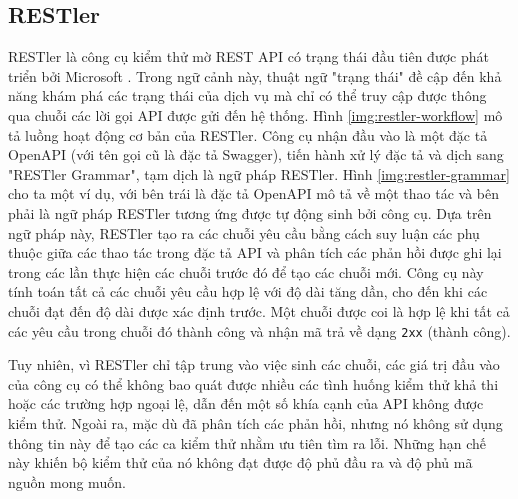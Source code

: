 \subsection{RESTler}
RESTler là công cụ kiểm thử mờ REST API có trạng thái đầu tiên được phát triển bởi Microsoft \cite{atlidakis2019restler}. Trong ngữ cảnh này, thuật ngữ "trạng thái" đề cập đến khả năng khám phá các trạng thái của dịch vụ mà chỉ có thể truy cập được thông qua chuỗi các lời gọi API được gửi đến hệ thống.
Hình \ref{img:restler-workflow} mô tả luồng hoạt động cơ bản của RESTler. Công cụ nhận đầu vào là một đặc tả OpenAPI (với tên gọi cũ là đặc tả Swagger), tiến hành xử lý đặc tả và dịch sang "RESTler Grammar", tạm dịch là ngữ pháp RESTler. Hình \ref{img:restler-grammar} cho ta một ví dụ, với bên trái là đặc tả OpenAPI mô tả về một thao tác và bên phải là ngữ pháp RESTler tương ứng được tự động sinh bởi công cụ. Dựa trên ngữ pháp này, RESTler tạo ra các chuỗi yêu cầu bằng cách suy luận các phụ thuộc giữa các thao tác trong đặc tả API và phân tích các phản hồi được ghi lại trong các lần thực hiện các chuỗi trước đó để tạo các chuỗi mới. Công cụ này tính toán tất cả các chuỗi yêu cầu hợp lệ với độ dài tăng dần, cho đến khi các chuỗi đạt đến độ dài được xác định trước. Một chuỗi được coi là hợp lệ khi tất cả các yêu cầu trong chuỗi đó thành công và nhận mã trả về dạng \texttt{2xx} (thành công).




 Tuy nhiên, vì RESTler chỉ tập trung vào việc sinh các chuỗi, các giá trị đầu vào của công cụ có thể không bao quát được nhiều các tình huống kiểm thử khả thi hoặc các trường hợp ngoại lệ, dẫn đến một số khía cạnh của API không được kiểm thử. Ngoài ra, mặc dù đã phân tích các phản hồi, nhưng nó không sử dụng thông tin này để tạo các ca kiểm thử nhằm ưu tiên tìm ra lỗi. Những hạn chế này khiến bộ kiểm thử của nó không đạt được độ phủ đầu ra và độ phủ mã nguồn mong muốn.
